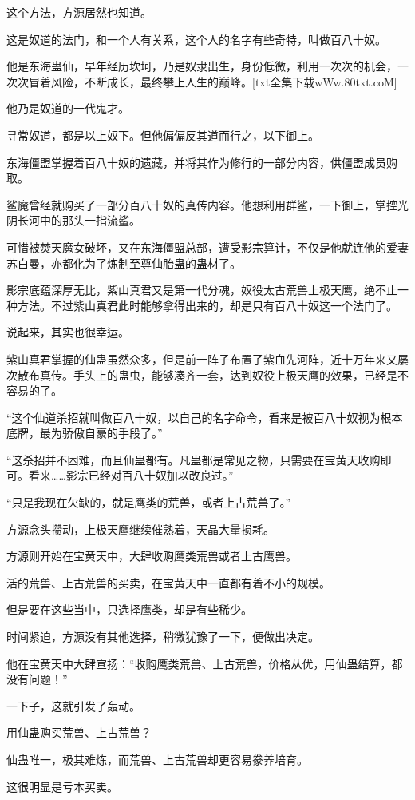 \begin{this_body}
这个方法，方源居然也知道。

这是奴道的法门，和一个人有关系，这个人的名字有些奇特，叫做百八十奴。

他是东海蛊仙，早年经历坎坷，乃是奴隶出生，身份低微，利用一次次的机会，一次次冒着风险，不断成长，最终攀上人生的巅峰。[txt全集下载wWw.80txt.coM]

他乃是奴道的一代鬼才。

寻常奴道，都是以上奴下。但他偏偏反其道而行之，以下御上。

东海僵盟掌握着百八十奴的遗藏，并将其作为修行的一部分内容，供僵盟成员购取。

鲨魔曾经就购买了一部分百八十奴的真传内容。他想利用群鲨，一下御上，掌控光阴长河中的那头一指流鲨。

可惜被焚天魔女破坏，又在东海僵盟总部，遭受影宗算计，不仅是他就连他的爱妻苏白曼，亦都化为了炼制至尊仙胎蛊的蛊材了。

影宗底蕴深厚无比，紫山真君又是第一代分魂，奴役太古荒兽上极天鹰，绝不止一种方法。不过紫山真君此时能够拿得出来的，却是只有百八十奴这一个法门了。

说起来，其实也很幸运。

紫山真君掌握的仙蛊虽然众多，但是前一阵子布置了紫血先河阵，近十万年来又屡次散布真传。手头上的蛊虫，能够凑齐一套，达到奴役上极天鹰的效果，已经是不容易的了。

“这个仙道杀招就叫做百八十奴，以自己的名字命令，看来是被百八十奴视为根本底牌，最为骄傲自豪的手段了。”

“这杀招并不困难，而且仙蛊都有。凡蛊都是常见之物，只需要在宝黄天收购即可。看来……影宗已经对百八十奴加以改良过。”

“只是我现在欠缺的，就是鹰类的荒兽，或者上古荒兽了。”

方源念头攒动，上极天鹰继续催熟着，天晶大量损耗。

方源则开始在宝黄天中，大肆收购鹰类荒兽或者上古鹰兽。

活的荒兽、上古荒兽的买卖，在宝黄天中一直都有着不小的规模。

但是要在这些当中，只选择鹰类，却是有些稀少。

时间紧迫，方源没有其他选择，稍微犹豫了一下，便做出决定。

他在宝黄天中大肆宣扬：“收购鹰类荒兽、上古荒兽，价格从优，用仙蛊结算，都没有问题！”

一下子，这就引发了轰动。

用仙蛊购买荒兽、上古荒兽？

仙蛊唯一，极其难炼，而荒兽、上古荒兽却更容易豢养培育。

这很明显是亏本买卖。


\end{this_body}
